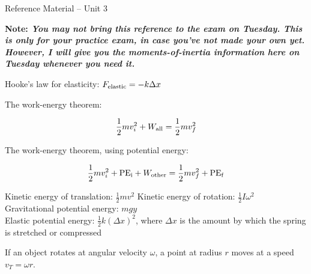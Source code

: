 \documentclass{article}
\begin{document}
\begin{center}
\Large \sc Reference Material -- Unit 3

\bigskip

\large

\bf Note: \it You may {\em not} bring this reference to the exam on Tuesday. This is only for your practice exam,
in case you've not made your own yet. However, I will give you the moments-of-inertia information here on Tuesday
whenever you need it.
\end{center}



\vspace{2in}

Hooke's law for elasticity: $F_{\rm elastic} = -k \Delta x$

The work-energy theorem: 

$$\frac{1}{2}mv_i^2 + W_{\rm all} = \frac{1}{2}mv_f^2$$

The work-energy theorem, using potential energy:

$$\frac{1}{2}mv_i^2 + {\rm PE_i} + W_{\rm other} = \frac{1}{2}mv_f^2 + {\rm PE_f}$$

Kinetic energy of translation: $\frac{1}{2}mv^2$
Kinetic energy of rotation: $\frac{1}{2}I\omega^2$ \\

Gravitational potential energy: $mgy$ \\
Elastic potential energy: $\frac{1}{2}k(\Delta x)^2$, where $\Delta x$ is the amount by which the spring is stretched or compressed

\bigskip

If an object rotates at angular velocity $\omega$, a point at radius $r$ moves at a speed $v_T = \omega r$.

\newpage
\end{document}
